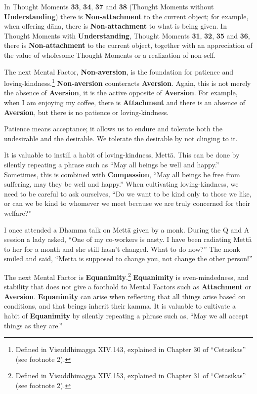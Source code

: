 In Thought Moments \textbf{33}, \textbf{34}, \textbf{37} and \textbf{38} (Thought Moments without \textbf{Understanding}) there is \textbf{Non-attachment} to the current object; for example, when offering dāna, there is \textbf{Non-attachment} to what is being given. In Thought Moments with \textbf{Understanding}, Thought Moments \textbf{31}, \textbf{32}, \textbf{35} and \textbf{36}, there is \textbf{Non-attachment} to the current object, together with an appreciation of the value of wholesome Thought Moments or a realization of non-self.

The next Mental Factor, \textbf{Non-aversion}, is the foundation for patience and loving-kindness.\footnote{Defined in Visuddhimagga XIV.143, explained in Chapter 30 of “Cetasikas” (see footnote 2).} \textbf{Non-aversion} counteracts \textbf{Aversion}. Again, this is not merely the absence of \textbf{Aversion}, it is the active opposite of \textbf{Aversion}. For example, when I am enjoying my coffee, there is \textbf{Attachment} and there is an absence of \textbf{Aversion}, but there is no patience or loving-kindness.

Patience means acceptance; it allows us to endure and tolerate both the undesirable and the desirable. We tolerate the desirable by not clinging to it.

It is valuable to instill a habit of loving-kindness, Mettā. This can be done by silently repeating a phrase such as “May all beings be well and happy.” Sometimes, this is combined with \textbf{Compassion}, “May all beings be free from suffering, may they be well and happy.” When cultivating loving-kindness, we need to be careful to ask ourselves, “Do we want to be kind only to those we like, or can we be kind to whomever we meet because we are truly concerned for their welfare?”

I once attended a Dhamma talk on Mettā given by a monk. During the Q and A session a lady asked, “One of my co-workers is nasty. I have been radiating Mettā to her for a month and she still hasn’t changed. What to do now?” The monk smiled and said, “Mettā is supposed to change you, not change the other person!”

The next Mental Factor is \textbf{Equanimity}.\footnote{Defined in Visuddhimagga XIV.153, explained in Chapter 31 of “Cetasikas” (see footnote 2).} \textbf{Equanimity} is even-mindedness, and stability that does not give a foothold to Mental Factors such as \textbf{Attachment} or \textbf{Aversion}. \textbf{Equanimity} can arise when reflecting that all things arise based on conditions, and that beings inherit their kamma. It is valuable to cultivate a habit of \textbf{Equanimity} by silently repeating a phrase such as, “May we all accept things as they are.”

